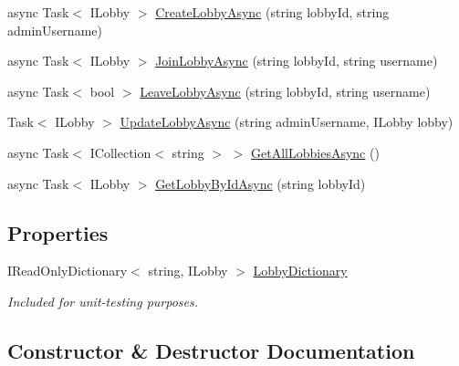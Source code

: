 \begin{DoxyCompactItemize}
async Task$<$ I\+Lobby $>$ \mbox{\hyperlink{class_application_1_1_controllers_1_1_lobby_controller_ac08d941f7da12f7791a691dbbdf0c1f3}{Create\+Lobby\+Async}} (string lobby\+Id, string admin\+Username)
\item 
async Task$<$ I\+Lobby $>$ \mbox{\hyperlink{class_application_1_1_controllers_1_1_lobby_controller_af9484a4c054717c0975175d93e45149c}{Join\+Lobby\+Async}} (string lobby\+Id, string username)
\item 
async Task$<$ bool $>$ \mbox{\hyperlink{class_application_1_1_controllers_1_1_lobby_controller_a7f0fb3932a42b76d5e4a9788aa0510e0}{Leave\+Lobby\+Async}} (string lobby\+Id, string username)
\item 
Task$<$ I\+Lobby $>$ \mbox{\hyperlink{class_application_1_1_controllers_1_1_lobby_controller_a2f30842e0480f28ddbe51ab420b35049}{Update\+Lobby\+Async}} (string admin\+Username, I\+Lobby lobby)
\item 
async Task$<$ I\+Collection$<$ string $>$ $>$ \mbox{\hyperlink{class_application_1_1_controllers_1_1_lobby_controller_a881adadc726a5daa68fe702439723630}{Get\+All\+Lobbies\+Async}} ()
\item 
async Task$<$ I\+Lobby $>$ \mbox{\hyperlink{class_application_1_1_controllers_1_1_lobby_controller_afe14da64961a1667fd7411484204c692}{Get\+Lobby\+By\+Id\+Async}} (string lobby\+Id)
\end{DoxyCompactItemize}
\subsection*{Properties}
\begin{DoxyCompactItemize}
\item 
I\+Read\+Only\+Dictionary$<$ string, I\+Lobby $>$ \mbox{\hyperlink{class_application_1_1_controllers_1_1_lobby_controller_adb1b5081f64dfe91e33d00b402632ec4}{Lobby\+Dictionary}}
\begin{DoxyCompactList}\small\item\em Included for unit-\/testing purposes. \end{DoxyCompactList}\end{DoxyCompactItemize}


\subsection{Constructor \& Destructor Documentation}
\mbox{\label{class_application_1_1_controllers_1_1_lobby_controller_a9c832739ad9b40794194b0f142279b6e}} 
